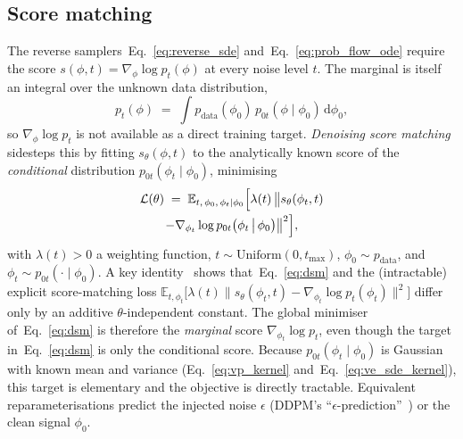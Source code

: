 \documentclass[reprint,twocolumn,superscriptaddress,preprintnumbers,amsmath,amssymb,aps,prd,floatfix]{revtex4-2}
\def\Eq#1{Eq.~\eqref{#1}}
\begin{document}
\subsection{Score matching}
\label{sec:dm_score_matching}

The reverse samplers~\Eq{eq:reverse_sde} and~\Eq{eq:prob_flow_ode} require the score $s(\phi,t)=\nabla_{\phi}\log p_{t}(\phi)$ at every noise level $t$. The marginal is itself an integral over the unknown data distribution,
\begin{equation}
p_{t}(\phi)\;=\;\int p_{\text{data}}(\phi_{0})\,p_{0t}(\phi\mid\phi_{0})\,\mathrm{d}\phi_{0},
\label{eq:marginal_pt}
\end{equation}
so $\nabla_{\phi}\log p_{t}$ is not available as a direct training target. \emph{Denoising score matching}~\cite{Vincent2011} sidesteps this by fitting $s_{\theta}(\phi,t)$ to the analytically known score of the \emph{conditional} distribution $p_{0t}(\phi_{t}\mid\phi_{0})$, minimising
\begin{multline}
\mathcal{L}(\theta) \;=\; \mathbb{E}_{t,\,\phi_{0},\,\phi_{t}\mid\phi_{0}}\Bigl[\lambda(t)\,\bigl\|s_{\theta}(\phi_{t},t)\\[-1pt]
-\nabla_{\phi_{t}}\log p_{0t}\bigl(\phi_{t}\,\bigl|\,\phi_{0}\bigr)\bigr\|^{2}\Bigr],
\label{eq:dsm}
\end{multline}
with $\lambda(t)>0$ a weighting function, $t\sim\mathrm{Uniform}(0,t_{\max})$, $\phi_{0}\sim p_{\text{data}}$, and $\phi_{t}\sim p_{0t}(\cdot\mid\phi_{0})$. A key identity~\cite{Vincent2011} shows that~\Eq{eq:dsm} and the (intractable) explicit score-matching loss $\mathbb{E}_{t,\phi_{t}}\!\bigl[\lambda(t)\|s_{\theta}(\phi_{t},t)-\nabla_{\phi_{t}}\log p_{t}(\phi_{t})\|^{2}\bigr]$ differ only by an additive $\theta$-independent constant. The global minimiser of~\Eq{eq:dsm} is therefore the \emph{marginal} score $\nabla_{\phi_{t}}\log p_{t}$, even though the target in~\Eq{eq:dsm} is only the conditional score. Because $p_{0t}(\phi_{t}\mid\phi_{0})$ is Gaussian with known mean and variance (\Eq{eq:vp_kernel} and~\Eq{eq:ve_sde_kernel}), this target is elementary and the objective is directly tractable. Equivalent reparameterisations predict the injected noise $\epsilon$ (DDPM's ``$\epsilon$-prediction''~\cite{Ho2020DDPM}) or the clean signal $\phi_{0}$.
\end{document}
